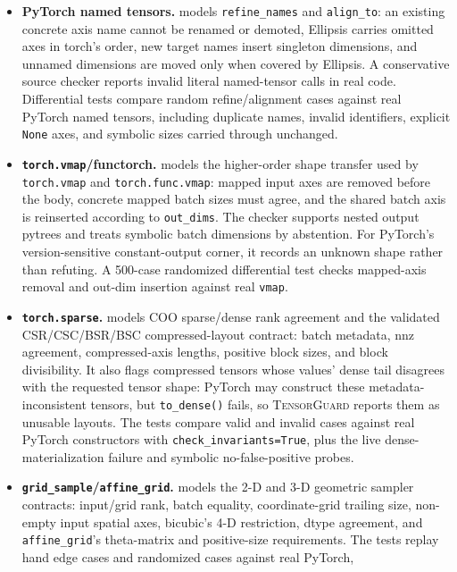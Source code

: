 \documentclass[11pt]{article}
\newcommand{\tg}{\textsc{TensorGuard}}
\begin{document}
\begin{itemize}[leftmargin=2em]
  \item \textbf{PyTorch named tensors.}
   models \texttt{refine\_names} and
  \texttt{align\_to}: an existing concrete axis name cannot be renamed or
  demoted, Ellipsis carries omitted axes in torch's order, new target names
  insert singleton dimensions, and unnamed dimensions are moved only when
  covered by Ellipsis.  A conservative source checker reports invalid literal
  named-tensor calls in real code.  Differential tests compare random
  refine/alignment cases against real PyTorch named tensors, including
  duplicate names, invalid identifiers, explicit \texttt{None} axes, and
  symbolic sizes carried through unchanged.
  \item \textbf{\texttt{torch.vmap}/functorch.}
   models the higher-order shape transfer used by
  \texttt{torch.vmap} and \texttt{torch.func.vmap}: mapped input axes are
  removed before the body, concrete mapped batch sizes must agree, and the
  shared batch axis is reinserted according to \texttt{out\_dims}.  The checker
  supports nested output pytrees and treats symbolic batch dimensions by
  abstention.  For PyTorch's version-sensitive constant-output corner, it
  records an unknown shape rather than refuting.  A 500-case randomized
  differential test checks mapped-axis removal and out-dim insertion against
  real \texttt{vmap}.
  \item \textbf{\texttt{torch.sparse}.}
   models COO sparse/dense rank agreement and the
  validated CSR/CSC/BSR/BSC compressed-layout contract: batch metadata, nnz
  agreement, compressed-axis lengths, positive block sizes, and block
  divisibility.  It also flags compressed tensors whose values' dense tail
  disagrees with the requested tensor shape: PyTorch may construct these
  metadata-inconsistent tensors, but \texttt{to\_dense()} fails, so \tg{}
  reports them as unusable layouts.  The tests compare valid and invalid cases
  against real PyTorch constructors with \texttt{check\_invariants=True}, plus
  the live dense-materialization failure and symbolic no-false-positive probes.
  \item \textbf{\texttt{grid\_sample}/\texttt{affine\_grid}.}
   models the 2-D and 3-D geometric sampler
  contracts: input/grid rank, batch equality, coordinate-grid trailing size,
  non-empty input spatial axes, bicubic's 4-D restriction, dtype agreement, and
  \texttt{affine\_grid}'s theta-matrix and positive-size requirements.  The
  tests replay hand edge cases and randomized cases against real PyTorch,

\end{itemize}
\end{document}
